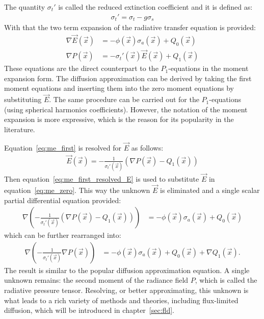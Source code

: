 The quantity $\sigma_t'$ is called the reduced extinction coefficient and it is defined as:
\begin{align*}
\sigma_t' = \sigma_t - g\sigma_s
\end{align*}
With that the two term expansion of the radiative transfer equation is provided:
\begin{align}
\label{eq:me_zero}
\nabla\vec{E}\left(\vec{x}\right)&=
-\phi(\vec{x})\sigma_a(\vec{x})
+Q_0\left(\vec{x}\right)
\\
\label{eq:me_first}
\nabla P\left(\vec{x}\right) &= -\sigma_t'(\vec{x})\vec{E}\left(\vec{x}\right)
+Q_1\left(\vec{x}\right)
\end{align}
These equations are the direct counterpart to the $P_1$-equations in the moment expansion form. The diffusion approximation can be derived by taking the first moment equations and inserting them into the zero moment equations by substituting $\vec{E}$. The same procedure can be carried out for the $P_1$-equations (using spherical harmonics coefficients). However, the notation of the moment expansion is more expressive, which is the reason for its popularity in the literature.

Equation~\ref{eq:me_first} is resolved for $\vec{E}$ as follows:
\begin{align}
\label{eq:me_first_resolved_E}
\vec{E}\left(\vec{x}\right) =
-\frac{1}{\sigma_t'\left(\vec{x}\right)}
\left(
\nabla P\left(\vec{x}\right)
-Q_1\left(\vec{x}\right)
\right)
\end{align}
Then equation~\ref{eq:me_first_resolved_E} is used to substitute $\vec{E}$ in equation~\ref{eq:me_zero}. This way the unknown $\vec{E}$ is eliminated and a single scalar partial differential equation provided:
\begin{align}
\nabla
\left(
-\frac{1}{\sigma_t'\left(\vec{x}\right)}
\left(
\nabla P\left(\vec{x}\right)
-Q_1\left(\vec{x}\right)
\right)
\right)&=
-\phi(\vec{x})\sigma_a(\vec{x})
+Q_0\left(\vec{x}\right)
\end{align}
which can be further rearranged into:
\begin{align}
\label{eq:general_diffusion_equation}
\nabla
\left(
-\frac{1}{\sigma_t'\left(\vec{x}\right)}
\nabla P\left(\vec{x}\right)
\right)&=
-\phi(\vec{x})\sigma_a(\vec{x})
+Q_0\left(\vec{x}\right)
+\nabla Q_1\left(\vec{x}\right)
.
\end{align}
The result is similar to the popular diffusion approximation equation. A single unknown remains: the second moment of the radiance field $P$, which is called the radiative pressure tensor. Resolving, or better approximating, this unknown is what leads to a rich variety of methods and theories, including flux-limited diffusion, which will be introduced in chapter~\ref{sec:fld}.





%

